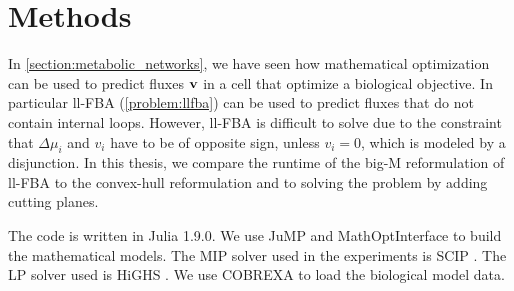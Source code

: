 \section{Methods}
In \cref{section:metabolic_networks}, we have seen how mathematical optimization can be used to predict fluxes $\bold v$ in a cell that optimize a biological objective. In particular ll-FBA (\cref{problem:llfba}) can be used to predict fluxes that do not contain internal loops. However, ll-FBA is difficult to solve due to the constraint that $\Delta \mu_i$ and $v_i$ have to be of opposite sign, unless $v_i=0$, which is modeled by a disjunction. In this thesis, we compare the runtime of the big-M reformulation of ll-FBA to the convex-hull reformulation and to solving the problem by adding cutting planes. 

The code is written in \textsf{Julia} 1.9.0. We use \textsf{JuMP} \cite{JuMP} and \textsf{MathOptInterface} \cite{mathoptinterface} to build the mathematical models. The MIP solver used in the experiments is \textsf{SCIP} \cite{SCIP}. The LP solver used is \textsf{HiGHS} \cite{HiGHS}. We use \textsf{COBREXA}\cite{cobrexa} to load the biological model data.

